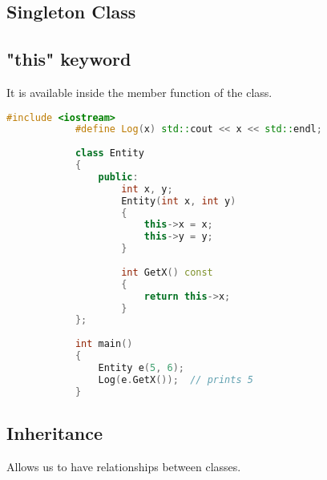 \documentclass{article}
\begin{document}
    
    \subsection{Singleton Class}
    
    \subsection{"this" keyword}
        It is available inside the member function of the class.
        \begin{lstlisting}[language=C++, caption='this" keyword example]
            #include <iostream>
            #define Log(x) std::cout << x << std::endl;
            
            class Entity
            {
            	public:
            		int x, y;
            		Entity(int x, int y)
            		{
            			this->x = x;
            			this->y = y;
            		}
            
            		int GetX() const
            		{
            			return this->x;
            		}
            };
            
            int main()
            {
            	Entity e(5, 6);
            	Log(e.GetX());	// prints 5
            }    
        \end{lstlisting}
        
    \subsection{Inheritance}
        Allows us to have relationships between classes.
\end{document}
